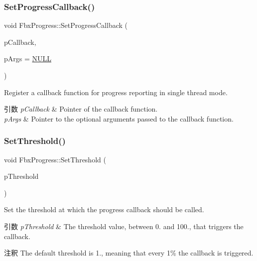 \subsubsection{\texorpdfstring{Set\+Progress\+Callback()}{SetProgressCallback()}}
{\footnotesize\ttfamily void Fbx\+Progress\+::\+Set\+Progress\+Callback (\begin{DoxyParamCaption}\item[{\hyperlink{fbxprogress_8h_a3765040904b462fb1f2673caba3488db}{Fbx\+Progress\+Callback}}]{p\+Callback,  }\item[{void $\ast$}]{p\+Args = {\ttfamily \hyperlink{fbxarch_8h_a070d2ce7b6bb7e5c05602aa8c308d0c4}{N\+U\+LL}} }\end{DoxyParamCaption})}

Register a callback function for progress reporting in single thread mode. 
\begin{DoxyParams}{引数}
{\em p\+Callback} & Pointer of the callback function. \\
\hline
{\em p\+Args} & Pointer to the optional arguments passed to the callback function. \\
\hline
\end{DoxyParams}
\mbox{\label{class_fbx_progress_a0f2eeea6d21c0917acde3e9c08a5a649}} 
\subsubsection{\texorpdfstring{Set\+Threshold()}{SetThreshold()}}
{\footnotesize\ttfamily void Fbx\+Progress\+::\+Set\+Threshold (\begin{DoxyParamCaption}\item[{float}]{p\+Threshold }\end{DoxyParamCaption})}

Set the threshold at which the progress callback should be called. 
\begin{DoxyParams}{引数}
{\em p\+Threshold} & The threshold value, between 0. and 100., that triggers the callback. \\
\hline
\end{DoxyParams}
\begin{DoxyRemark}{注釈}
The default threshold is 1., meaning that every 1\% the callback is triggered. 
\end{DoxyRemark}
\mbox{\label{class_fbx_progress_a5a704be350a16f935729750888644040}} 
